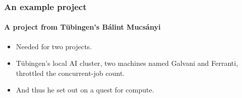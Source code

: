 \documentclass[10pt,aspectratio=169,notheorems]{beamer}
\begin{document}
\begin{frame}
    \frametitle{An example project}
    \framesubtitle{A project from T\"ubingen's B\'alint Mucs\'anyi}
    \begin{itemize}
        \item Needed  for two projects.
        \item T\"ubingen's local AI cluster, two machines named Galvani and Ferranti, throttled the concurrent-job count.
        \item And thus he set out on a quest for compute.
    \end{itemize}
\end{frame}
\end{document}
